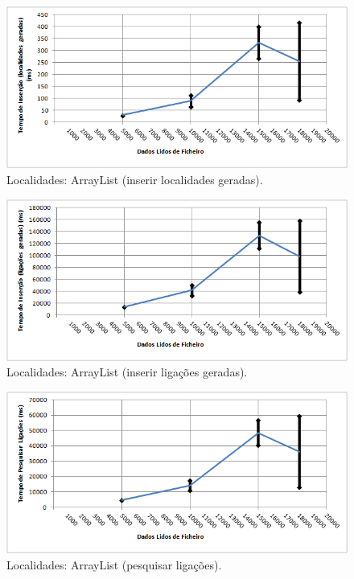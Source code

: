 \documentclass[a5paper,twocolumn, 11pt]{article}
\begin{document}
\begin{figure}[h!b!t!]
    \caption[Localidades: ArrayList (inserir localidades geradas)]{Localidades: ArrayList (inserir localidades geradas).}
    \label{hashtable}
    \centering
        \includegraphics[width=400pt]{cloc_conf1_o2.png}
\end{figure}
\begin{figure}[h!b!t!]
    \caption[Localidades: ArrayList (inserir ligações geradas)]{Localidades: ArrayList (inserir ligações geradas).}
    \label{hashtable}
    \centering
        \includegraphics[width=400pt]{cloc_conf1_o3.png}
\end{figure}
\begin{figure}[h!b!t!]
    \caption[Localidades: ArrayList (pesquisar ligações)]{Localidades: ArrayList (pesquisar ligações).}
    \label{hashtable}
    \centering
        \includegraphics[width=400pt]{cloc_conf1_o4.png}
\end{figure}
\end{document}
